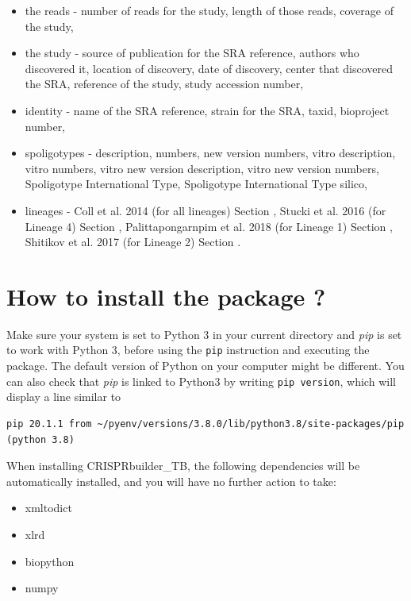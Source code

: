 \documentclass[twoside,a4paper,11pt,frenchb,openany]{report}
\begin{document}
\begin{itemize}
\item
  the reads - number of reads for the study, length of those reads,
  coverage of the study,
\item
  the study - source of publication for the SRA reference, authors who
  discovered it, location of discovery, date of discovery, center that
  discovered the SRA, reference of the study, study accession number,
\item
  identity - name of the SRA reference, strain for the SRA, taxid,
  bioproject number,
\item
  spoligotypes - description, numbers, new version numbers, vitro
  description, vitro numbers, vitro new version description, vitro new
  version numbers, Spoligotype International Type, Spoligotype
  International Type silico,
\item
  lineages - Coll et al. 2014 (for all lineages) Section \cite{coll-preston},
  Stucki et al. 2016 (for Lineage 4) Section \cite{stucki-brites},
  Palittapongarnpim et al. 2018 (for Lineage 1) Section \cite{pali-ajaw},
  Shitikov et al. 2017 (for Lineage 2) Section \cite{shiti-kolchenko}.
\end{itemize}


    \section{How to install the package
?}\label{how-to-install-the-package}

Make sure your system is set to Python 3 in your current directory and \textit{pip} is set to work with Python 3, before using the \texttt{pip} instruction and executing the package. The default version of Python on your computer might be different. You can also check that \textit{pip} is linked to Python3 by writing \texttt{pip \textemdash \textemdash version}, which will display a line similar to

\begin{verbatim}
pip 20.1.1 from ~/pyenv/versions/3.8.0/lib/python3.8/site-packages/pip (python 3.8)
\end{verbatim}

When installing CRISPRbuilder\_TB, the following dependencies will be automatically installed, and you will have no further action to take:
\begin{itemize}
\item xmltodict
\item xlrd
\item biopython
\item numpy
\end{itemize}
\end{document}
